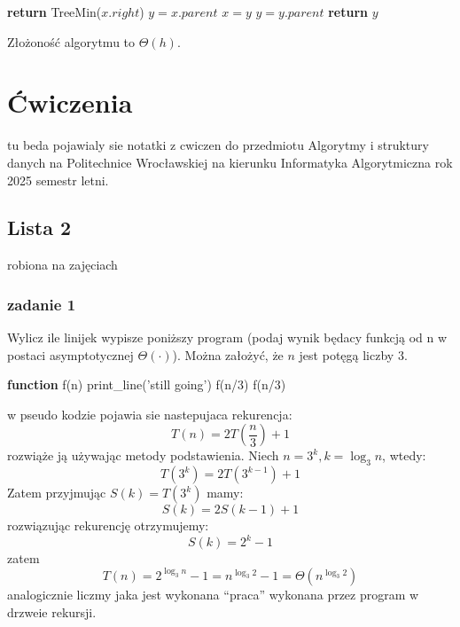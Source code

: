 \documentclass[11pt,a4paper]{article}
\begin{document}
\begin{itemize}
\begin{algorithm}
            \begin{algorithmic}[1]
                    \State \textbf{return} TreeMin($x.right$)
                \Else
                    \State $y = x.parent$
                        \State $x = y$
                        \State $y = y.parent$
                    \EndWhile
                    \State \textbf{return} $y$
                \EndIf
                \EndProcedure
            \end{algorithmic}
        \end{algorithm}
        Złożoność algorytmu to $\Theta(h)$.
\end{itemize}





\section{Ćwiczenia}
tu beda pojawialy sie notatki z cwiczen do przedmiotu Algorytmy i struktury danych na Politechnice Wrocławskiej na kierunku Informatyka Algorytmiczna rok 2025 semestr letni.

\subsection{Lista 2}
robiona na zajęciach \date{2025-03-10}
\subsubsection{zadanie 1}
Wylicz ile linijek wypisze poniższy program (podaj wynik będacy funkcją od n w postaci asymptotycznej $\Theta(\cdot)$). Można założyć, że $n$ jest potęgą liczby $3$.
\begin{algorithm}
\begin{algorithmic}[1]
\State \textbf{function} f(n)
    \State print\_line('still going')
    \State f(n/3)
    \State f(n/3)
\EndIf
\end{algorithmic}
\end{algorithm}
w pseudo kodzie pojawia sie nastepujaca rekurencja:
\[
    T(n) = 2T(\frac{n}{3}) + 1
\]
rozwiąże ją używając metody podstawienia. Niech $n=3^k, k = \log_3 n$, wtedy:
\[
    T(3^k) = 2T(3^{k-1}) + 1
\]
Zatem przyjmując $S(k) = T(3^k)$ mamy:
\[
    S(k) = 2S(k-1) + 1
\]
rozwiązując rekurencję otrzymujemy:
\[
    S(k) = 2^k - 1
\]
zatem
\[
    T(n) = 2^{\log_3 n} - 1 = n^{\log_3 2} - 1 = \Theta(n^{\log_3 2})
\]
analogicznie liczmy jaka jest wykonana ``praca'' wykonana przez program w drzweie rekursji.
\end{document}
